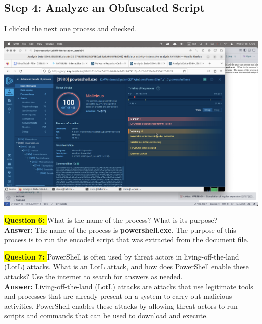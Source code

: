 \documentclass{article}
\begin{document}
\newpage

\subsection*{Step 4: Analyze an Obfuscated Script}

I clicked the next one process and checked.

\includegraphics[width=1\textwidth]{11.png}

\textbf{\colorbox{yellow}{Question 6: }} What is the name of the process? What is its purpose? \\
\textbf{Answer: } The name of the process is \textbf{powershell.exe}. The purpose of this process is to run the encoded script that was extracted from the document file. \\

\vspace{1\baselineskip}

\textbf{\colorbox{yellow}{Question 7: }} PowerShell is often used by threat actors in living-off-the-land (LotL) attacks. What is an LotL attack, and how does PowerShell enable these attacks? Use the internet to search for answers as needed.  \\

\textbf{Answer: } Living-off-the-land (LotL) attacks are attacks that use legitimate tools and processes that are already present on a system to carry out malicious activities. PowerShell enables these attacks by allowing threat actors to run scripts and commands that can be used to download and execute. \\

\vspace{1\baselineskip}
\end{document}
